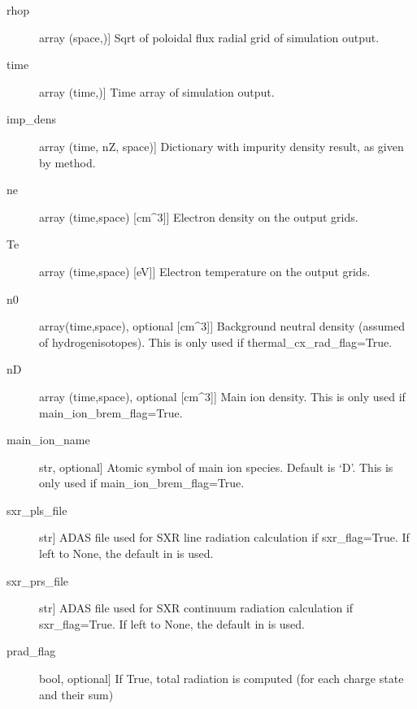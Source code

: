 \documentclass[letterpaper,10pt,english]{sphinxmanual}
\begin{document}
\begin{fulllineitems}
\begin{description}
\begin{description}
\item[{rhop}] \leavevmode{[}array (space,){]}
Sqrt of poloidal flux radial grid of simulation output.

\item[{time}] \leavevmode{[}array (time,){]}
Time array of simulation output.

\item[{imp\_dens}] \leavevmode{[}array (time, nZ, space){]}
Dictionary with impurity density result, as given by  method.

\item[{ne}] \leavevmode{[}array (time,space) {[}cm\textasciicircum{}\sphinxhyphen{}3{]}{]}
Electron density on the output grids.

\item[{Te}] \leavevmode{[}array (time,space) {[}eV{]}{]}
Electron temperature on the output grids.

\item[{n0}] \leavevmode{[}array(time,space), optional {[}cm\textasciicircum{}\sphinxhyphen{}3{]}{]}
Background neutral density (assumed of hydrogen\sphinxhyphen{}isotopes). 
This is only used if thermal\_cx\_rad\_flag=True.

\item[{nD}] \leavevmode{[}array (time,space), optional {[}cm\textasciicircum{}\sphinxhyphen{}3{]}{]}
Main ion density. This is only used if main\_ion\_brem\_flag=True.

\item[{main\_ion\_name}] \leavevmode{[}str, optional{]}
Atomic symbol of main ion species. Default is ‘D’.
This is only used if main\_ion\_brem\_flag=True.

\item[{sxr\_pls\_file}] \leavevmode{[}str{]}
ADAS file used for SXR line radiation calculation if sxr\_flag=True. If left to None, the 
default in {\hyperref[\detokenize{aurora:aurora.atomic.adas_files_dict}]{}} is used.

\item[{sxr\_prs\_file}] \leavevmode{[}str{]}
ADAS file used for SXR continuum radiation calculation if sxr\_flag=True. If left to None, 
the default in {\hyperref[\detokenize{aurora:aurora.atomic.adas_files_dict}]{}} is used.

\item[{prad\_flag}] \leavevmode{[}bool, optional{]}
If True, total radiation is computed (for each charge state and their sum)


\end{description}
\end{description}
\end{fulllineitems}
\end{document}
